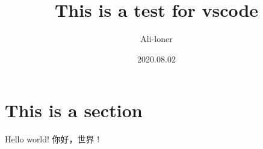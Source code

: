 \documentclass[a4paper]{article}
\title{\heiti\zihao{2} This is a test for vscode}
\author{\songti Ali-loner}
\date{2020.08.02}
\begin{document}
	\maketitle
\begin{abstract}
	\lipsum[2]
\end{abstract}
\tableofcontents
\section{This is a section}
Hello world! 你好，世界 !
\end{document}
